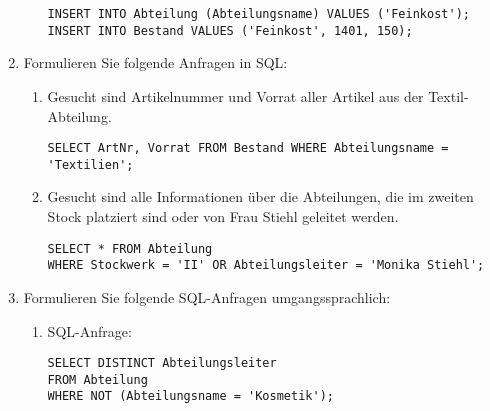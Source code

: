 \documentclass{lehramt-informatik-haupt}
\begin{document}
\begin{enumerate}
\begin{enumerate}
\begin{antwort}[muster]
\begin{verbatim}
INSERT INTO Abteilung (Abteilungsname) VALUES ('Feinkost');
INSERT INTO Bestand VALUES ('Feinkost', 1401, 150);
\end{verbatim}
\end{antwort}

\end{enumerate}


\item Formulieren Sie folgende Anfragen in SQL:

\begin{enumerate}


\item Gesucht sind Artikelnummer und Vorrat aller Artikel aus der
Textil-Abteilung.

\begin{antwort}[muster]
\begin{verbatim}
SELECT ArtNr, Vorrat FROM Bestand WHERE Abteilungsname = 'Textilien';
\end{verbatim}
\end{antwort}


\item Gesucht sind alle Informationen über die Abteilungen, die im
zweiten Stock platziert sind oder von Frau Stiehl geleitet werden.

\begin{antwort}[muster]
\begin{verbatim}
SELECT * FROM Abteilung
WHERE Stockwerk = 'II' OR Abteilungsleiter = 'Monika Stiehl';
\end{verbatim}
\end{antwort}

\end{enumerate}


\item Formulieren Sie folgende SQL-Anfragen umgangssprachlich:

\begin{enumerate}


\item SQL-Anfrage:

\begin{verbatim}
SELECT DISTINCT Abteilungsleiter
FROM Abteilung
WHERE NOT (Abteilungsname = 'Kosmetik');
\end{verbatim}


\end{enumerate}
\end{enumerate}
\end{document}

